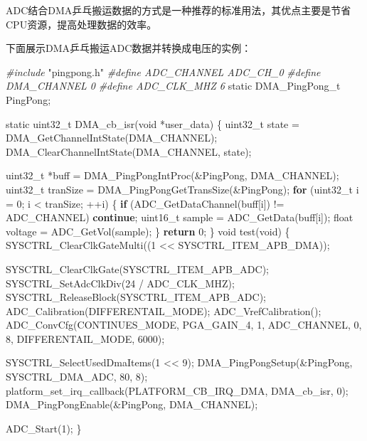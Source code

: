 \documentclass[
  12pt,
]{book}
\newenvironment{Shaded}{\begin{snugshade}}{\end{snugshade}}
\newcommand{\ControlFlowTok}[1]{\textcolor[rgb]{0.13,0.29,0.53}{\textbf{#1}}}
\newcommand{\DataTypeTok}[1]{\textcolor[rgb]{0.13,0.29,0.53}{#1}}
\newcommand{\DecValTok}[1]{\textcolor[rgb]{0.00,0.00,0.81}{#1}}
\newcommand{\ImportTok}[1]{#1}
\newcommand{\NormalTok}[1]{#1}
\newcommand{\PreprocessorTok}[1]{\textcolor[rgb]{0.56,0.35,0.01}{\textit{#1}}}
\begin{document}
ADC结合DMA乒乓搬运数据的方式是一种推荐的标准用法，其优点主要是节省CPU资源，提高处理数据的效率。

下面展示DMA乒乓搬运ADC数据并转换成电压的实例：

\begin{Shaded}
\begin{Highlighting}[]
\PreprocessorTok{#include }\ImportTok{"pingpong.h"}
\PreprocessorTok{#define ADC_CHANNEL    ADC_CH_0}
\PreprocessorTok{#define DMA_CHANNEL    0}
\PreprocessorTok{#define ADC_CLK_MHZ    6}
\DataTypeTok{static}\NormalTok{ DMA_PingPong_t PingPong;}

\DataTypeTok{static} \DataTypeTok{uint32_t}\NormalTok{ DMA_cb_isr(}\DataTypeTok{void}\NormalTok{ *user_data)}
\NormalTok{\{}
    \DataTypeTok{uint32_t}\NormalTok{ state = DMA_GetChannelIntState(DMA_CHANNEL);}
\NormalTok{    DMA_ClearChannelIntState(DMA_CHANNEL, state);}

    \DataTypeTok{uint32_t}\NormalTok{ *buff = DMA_PingPongIntProc(&PingPong, DMA_CHANNEL);}
    \DataTypeTok{uint32_t}\NormalTok{ tranSize = DMA_PingPongGetTransSize(&PingPong);}
    \ControlFlowTok{for}\NormalTok{ (}\DataTypeTok{uint32_t}\NormalTok{ i = }\DecValTok{0}\NormalTok{; i < tranSize; ++i) \{}
        \ControlFlowTok{if}\NormalTok{ (ADC_GetDataChannel(buff[i]) != ADC_CHANNEL) }\ControlFlowTok{continue}\NormalTok{;}
        \DataTypeTok{uint16_t}\NormalTok{ sample = ADC_GetData(buff[i]);}
        \DataTypeTok{float}\NormalTok{ voltage = ADC_GetVol(sample);}
\NormalTok{    \}}
    \ControlFlowTok{return} \DecValTok{0}\NormalTok{;}
\NormalTok{\}}
\DataTypeTok{void}\NormalTok{ test(}\DataTypeTok{void}\NormalTok{)}
\NormalTok{\{}
\NormalTok{    SYSCTRL_ClearClkGateMulti((}\DecValTok{1}\NormalTok{ << SYSCTRL_ITEM_APB_DMA));}

\NormalTok{    SYSCTRL_ClearClkGate(SYSCTRL_ITEM_APB_ADC);}
\NormalTok{    SYSCTRL_SetAdcClkDiv(}\DecValTok{24}\NormalTok{ / ADC_CLK_MHZ);}
\NormalTok{    SYSCTRL_ReleaseBlock(SYSCTRL_ITEM_APB_ADC);}
\NormalTok{    ADC_Calibration(DIFFERENTAIL_MODE);}
\NormalTok{    ADC_VrefCalibration();}
\NormalTok{    ADC_ConvCfg(CONTINUES_MODE, PGA_GAIN_4, }\DecValTok{1}\NormalTok{, ADC_CHANNEL, }\DecValTok{0}\NormalTok{, }\DecValTok{8}\NormalTok{, DIFFERENTAIL_MODE, }\DecValTok{6000}\NormalTok{);}

\NormalTok{    SYSCTRL_SelectUsedDmaItems(}\DecValTok{1}\NormalTok{ << }\DecValTok{9}\NormalTok{);}
\NormalTok{    DMA_PingPongSetup(&PingPong, SYSCTRL_DMA_ADC, }\DecValTok{80}\NormalTok{, }\DecValTok{8}\NormalTok{);}
\NormalTok{    platform_set_irq_callback(PLATFORM_CB_IRQ_DMA, DMA_cb_isr, }\DecValTok{0}\NormalTok{);}
\NormalTok{    DMA_PingPongEnable(&PingPong, DMA_CHANNEL);}
    
\NormalTok{    ADC_Start(}\DecValTok{1}\NormalTok{);}
\NormalTok{\}}
\end{Highlighting}
\end{Shaded}
\end{document}
